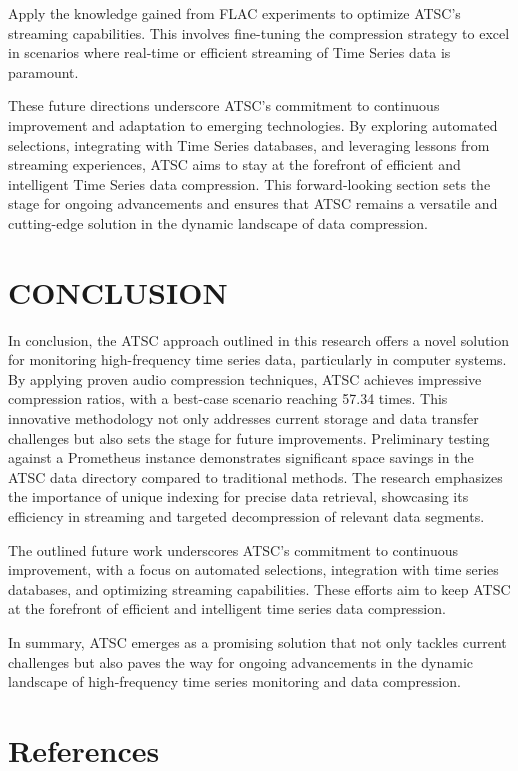 \documentclass[conference]{IEEEtran}
\begin{document}
Apply the knowledge gained from FLAC experiments to optimize ATSC's streaming capabilities. This involves fine-tuning the compression strategy to excel in scenarios where real-time or efficient streaming of Time Series data is paramount.

These future directions underscore ATSC's commitment to continuous improvement and adaptation to emerging technologies. By exploring automated selections, integrating with Time Series databases, and leveraging lessons from streaming experiences, ATSC aims to stay at the forefront of efficient and intelligent Time Series data compression. This forward-looking section sets the stage for ongoing advancements and ensures that ATSC remains a versatile and cutting-edge solution in the dynamic landscape of data compression.


\section{CONCLUSION}

In conclusion, the ATSC approach outlined in this research offers a novel solution for monitoring high-frequency time series data, particularly in computer systems. By applying proven audio compression techniques, ATSC achieves impressive compression ratios, with a best-case scenario reaching 57.34 times. This innovative methodology not only addresses current storage and data transfer challenges but also sets the stage for future improvements.
\vspace{5pt}
Preliminary testing against a Prometheus instance demonstrates significant space savings in the ATSC data directory compared to traditional methods. The research emphasizes the importance of unique indexing for precise data retrieval, showcasing its efficiency in streaming and targeted decompression of relevant data segments.

The outlined future work underscores ATSC's commitment to continuous improvement, with a focus on automated selections, integration with time series databases, and optimizing streaming capabilities. These efforts aim to keep ATSC at the forefront of efficient and intelligent time series data compression.

In summary, ATSC emerges as a promising solution that not only tackles current challenges but also paves the way for ongoing advancements in the dynamic landscape of high-frequency time series monitoring and data compression.

\section{References}
\end{document}
